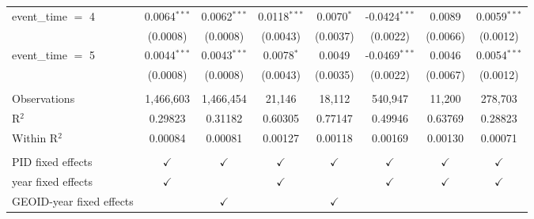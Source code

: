 \begin{tabular}{lccccccc}
   event\_time $=$ 4        & 0.0064$^{***}$  & 0.0062$^{***}$  & 0.0118$^{***}$ & 0.0070$^{*}$  & -0.0424$^{***}$ & 0.0089                 & 0.0059$^{***}$\\   
                            & (0.0008)        & (0.0008)        & (0.0043)       & (0.0037)      & (0.0022)        & (0.0066)               & (0.0012)\\   
   event\_time $=$ 5        & 0.0044$^{***}$  & 0.0043$^{***}$  & 0.0078$^{*}$   & 0.0049        & -0.0469$^{***}$ & 0.0046                 & 0.0054$^{***}$\\   
                            & (0.0008)        & (0.0008)        & (0.0043)       & (0.0035)      & (0.0022)        & (0.0067)               & (0.0012)\\   
    \\
   Observations             & 1,466,603       & 1,466,454       & 21,146         & 18,112        & 540,947         & 11,200                 & 278,703\\  
   R$^2$                    & 0.29823         & 0.31182         & 0.60305        & 0.77147       & 0.49946         & 0.63769                & 0.28823\\  
   Within R$^2$             & 0.00084         & 0.00081         & 0.00127        & 0.00118       & 0.00169         & 0.00130                & 0.00071\\  
    \\
   PID fixed effects        & $\checkmark$    & $\checkmark$    & $\checkmark$   & $\checkmark$  & $\checkmark$    & $\checkmark$           & $\checkmark$\\   
   year fixed effects       & $\checkmark$    &                 & $\checkmark$   &               & $\checkmark$    & $\checkmark$           & $\checkmark$\\   
   GEOID-year fixed effects &                 & $\checkmark$    &                & $\checkmark$  &                 &                        & \\  
   \bottomrule
\end{tabular}
\par\endgroup


